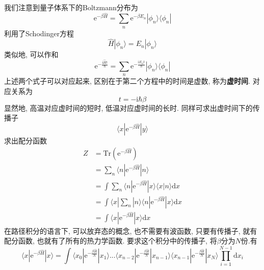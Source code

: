         我们注意到量子体系下的Boltzmann分布为
        \begin{equation}
            \mathrm{e}^{-\beta \hat{H}} = \sum_n \mathrm{e}^{-\beta E_n} |\phi_n \rangle \langle \phi_n|
        \end{equation}
        利用了Schodinger方程
        \begin{equation}
            \hat{H} |\phi_n \rangle = E_n |\phi_n \rangle
        \end{equation}
        类似地, 可以作和
        \begin{equation}
            \mathrm{e}^{-\frac {\mathrm{i}\hat{H}t}{\hbar}} = \sum_n \mathrm{e}^{-\frac {\mathrm{i}E_n t}{\hbar}} |\phi_n \rangle \langle \phi_n|
        \end{equation}
        上述两个式子可以对应起来, 区别在于第二个方程中的时间是虚数, 称为\textbf{虚时间}. 对应关系为
        \begin{equation}
            t = -\mathrm{i}\hbar \beta
        \end{equation}
        显然地, 高温对应虚时间的短时, 低温对应虚时间的长时. 同样可求出虚时间下的传播子
        \begin{equation}
            \langle x|\mathrm{e}^{-\beta \hat{H}}|y\rangle
        \end{equation}
        求出配分函数
        \begin{equation}\begin{aligned}
            Z &= \mathrm{Tr}(\mathrm{e}^{-\beta \hat{H}}) \\
            &= \sum_n \langle n| \mathrm{e}^{-\beta \hat{H}}|n\rangle \\
            &= \int \sum_n \langle n| \mathrm{e}^{-\beta \hat{H}}|x \rangle \langle x|n\rangle \mathrm{d}x\\
            &= \int \langle x|\sum_n|n \rangle \langle n| \mathrm{e}^{-\beta \hat{H}}|x\rangle \mathrm{d}x\\
            &= \int \langle x|\mathrm{e}^{-\beta \hat{H}}|x\rangle \mathrm{d}x
        \end{aligned}\end{equation}
        在路径积分的语言下, 可以放弃态的概念, 也不需要有波函数, 只要有传播子, 就有配分函数, 也就有了所有的热力学函数. 要求这个积分中的传播子, 将$\beta$分为$N$份.有
        \begin{equation}
            \langle x|\mathrm{e}^{-\beta \hat{H}}|x\rangle  = \int \langle x_0|\mathrm{e}^{-\frac {\beta \hat{H}}N} |x_1 \rangle ... \langle x_{n-2}|\mathrm{e}^{-\frac {\beta \hat{H}}N} |x_{n-1} \rangle \langle x_{n-1}|\mathrm{e}^{-\frac {\beta \hat{H}}N} |x_N \rangle \prod_{i=1}^{N-1}\mathrm{d}x_i
        \end{equation}
